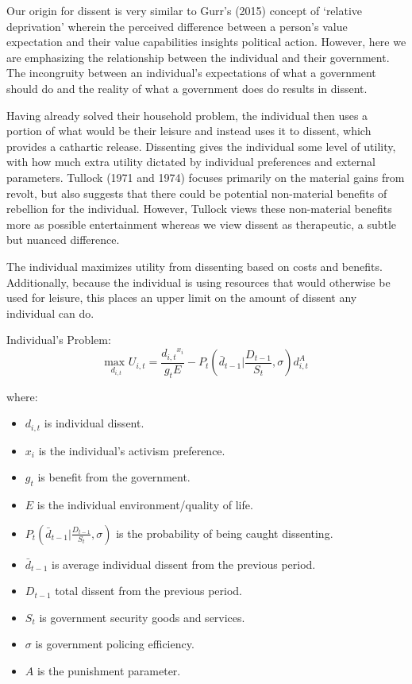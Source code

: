 \documentclass[12pt]{article}
\begin{document}
\begin{spacing}{1.5}
Our origin for dissent is very similar to Gurr's (2015) concept of `relative deprivation' wherein the perceived difference between a person's value expectation and their value capabilities insights political action. However, here we are emphasizing the relationship between the individual and their government. The incongruity between an individual's expectations of what a government should do and the reality of what a government does do results in dissent.

Having already solved their household problem, the individual then uses a portion of what would be their leisure and instead uses it to dissent, which provides a cathartic release. Dissenting gives the individual some level of utility, with how much extra utility dictated by individual preferences and external parameters. Tullock (1971 and 1974) focuses primarily on the material gains from revolt, but also suggests that there could be potential non-material benefits of rebellion for the individual. However, Tullock views these non-material benefits more as possible entertainment whereas we view dissent as therapeutic, a subtle but nuanced difference. 

The individual maximizes utility from dissenting based on costs and benefits. Additionally, because the individual is using resources that would otherwise be used for leisure, this places an upper limit on the amount of dissent any individual can do. 

\vspace{.5 em}
\noindent Individual's Problem:
\begin{equation}
{\underset{d_{i,t}}{\text{max }}}  U_{i,t}= \frac{{d_{i,t}}^{{x}_i}}{g_t  E} - P_t \left( \bar{d}_{t-1} \Bigg|\frac{D_{t-1}}{S_t},\sigma \right)d_{i,t}^A
\end{equation}

\noindent where:
\begin{itemize}
	\item $d_{i,t}$ is individual dissent.  
	\item ${x}_i$ is the individual's activism preference. 
	\item $g_t$ is benefit from the government. 
	\item $E$ is the individual environment/quality of life. 
	\item $P_t \left( \bar{d}_{t-1} \Bigg|\frac{D_{t-1}}{S_t},\sigma \right)$ is the probability of being caught dissenting. 
	\item $\bar{d}_{t-1}$ is average individual dissent from the previous period.  
	\item $D_{t-1}$ total dissent from the previous period.
	\item $S_t$ is government security goods and services. 
	\item $\sigma$ is government policing efficiency. 
	\item $A$ is the punishment parameter. 
\end{itemize}
 

\end{spacing}
\end{document}
